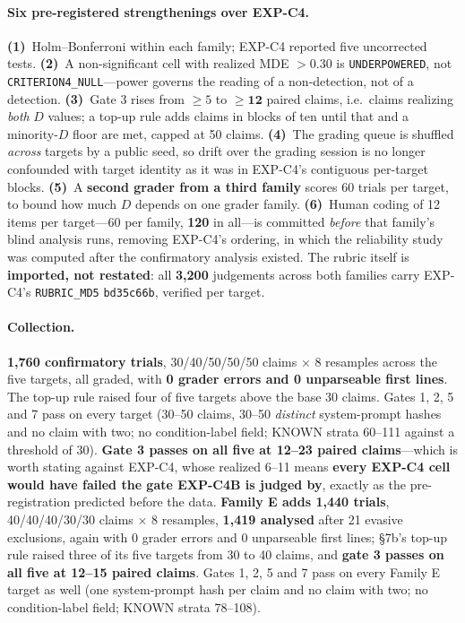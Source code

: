 \paragraph{Six pre-registered strengthenings over EXP-C4.} \textbf{(1)}~Holm--Bonferroni within each family; EXP-C4 reported five uncorrected tests. \textbf{(2)}~A non-significant cell with realized MDE $>0.30$ is \texttt{UNDERPOWERED}, not \texttt{CRITERION4\_NULL}---power governs the reading of a non-detection, not of a detection. \textbf{(3)}~Gate 3 rises from $\ge\!5$ to $\ge\!\mathbf{12}$ paired claims, i.e.\ claims realizing \emph{both} $D$ values; a top-up rule adds claims in blocks of ten until that and a minority-$D$ floor are met, capped at 50 claims. \textbf{(4)}~The grading queue is shuffled \emph{across} targets by a public seed, so drift over the grading session is no longer confounded with target identity as it was in EXP-C4's contiguous per-target blocks. \textbf{(5)}~A \textbf{second grader from a third family} scores 60 trials per target, to bound how much $D$ depends on one grader family. \textbf{(6)}~Human coding of 12 items per target---60 per family, \textbf{120} in all---is committed \emph{before} that family's blind analysis runs, removing EXP-C4's ordering, in which the reliability study was computed after the confirmatory analysis existed. The rubric itself is \textbf{imported, not restated}: all \textbf{3{,}200} judgements across both families carry EXP-C4's \texttt{RUBRIC\_MD5} \texttt{bd35c66b}, verified per target.

\paragraph{Collection.} \textbf{1{,}760 confirmatory trials}, 30/40/50/50/50 claims $\times$ 8 resamples across the five targets, all graded, with \textbf{0 grader errors and 0 unparseable first lines}. The top-up rule raised four of five targets above the base 30 claims. Gates 1, 2, 5 and 7 pass on every target (30--50 claims, 30--50 \emph{distinct} system-prompt hashes and no claim with two; no condition-label field; KNOWN strata 60--111 against a threshold of 30). \textbf{Gate 3 passes on all five at 12--23 paired claims}---which is worth stating against EXP-C4, whose realized 6--11 means \textbf{every EXP-C4 cell would have failed the gate EXP-C4B is judged by}, exactly as the pre-registration predicted before the data. \textbf{Family E adds 1{,}440 trials}, 40/40/40/30/30 claims $\times$ 8 resamples, \textbf{1{,}419 analysed} after 21 evasive exclusions, again with 0 grader errors and 0 unparseable first lines; §7b's top-up rule raised three of its five targets from 30 to 40 claims, and \textbf{gate 3 passes on all five at 12--15 paired claims}. Gates 1, 2, 5 and 7 pass on every Family E target as well (one system-prompt hash per claim and no claim with two; no condition-label field; KNOWN strata 78--108).

